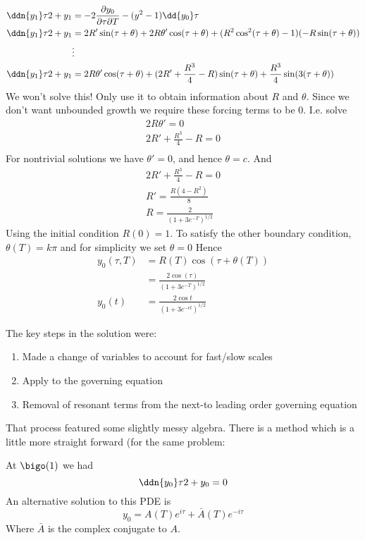 \documentclass{X:/Documents/Coding/Latex/myassignment}
\begin{document}
\begin{align*}
        \ddn{y_1}\tau2 + y_1 &= - 2\frac{\partial y_0}{\partial \tau \partial T} - (y^2-1)\dd{y_0}\tau\\
        \ddn{y_1}\tau2 + y_1 &=  2R'\sin(\tau+\theta) + 2R\theta'\cos(\tau+\theta) +(R^2\cos^2(\tau+\theta)-1)(-R\sin(\tau+\theta))\\
        &\vdots\\
        \ddn{y_1}\tau2 + y_1 &=  2R\theta'\cos(\tau+\theta) + (2R' + \frac{R^3}{4} - R) \sin(\tau +\theta) + \frac{R^3}{4} \sin(3(\tau+\theta))
\end{align*}
We won't solve this! Only use it to obtain information about $R$ and $\theta$.
Since we don't want unbounded growth we require these forcing terms to be $0$. I.e. solve
\begin{align*}
    2R\theta' =0\\
    2R' + \frac{R^3}{4} - R = 0\\
\end{align*}
For nontrivial solutions we have $\theta' =0$, and hence $\theta = c$. And 
\begin{align*}
    2R' + \frac{R^3}{4} - R = 0\\
    R' = \frac{R(4-R^2)}{8}\\ 
    R = \frac{2}{(1+3e^{-T})^{1/2}}
\end{align*}
Using the initial condition $R(0)=1$.
To satisfy the other boundary condition, $\theta(T) = k\pi$ and for simplicity we set $\theta =0 $
Hence
\begin{align*}
    y_0(\tau,T) &= R(T) \cos(\tau + \theta(T))\\
    &= \frac{2\cos(\tau)}{(1+3e^{-T})^{1/2}}\\
    y_0(t)&= \frac{2\cos t}{(1+3e^{-\epsilon t})^{1/2}}
\end{align*}

The key steps in the solution were:
\begin{enumerate}
    \item Made a change of variables to account for fast/slow scales
    \item Apply to the governing equation
    \item Removal of resonant terms from the next-to leading order governing equation
\end{enumerate}
That process featured some slightly messy algebra. There is a method which is a little more straight forward (for the same problem:


At $\bigo(1)$ we had
\[\ddn{y_0}\tau 2 + y_0 = 0\]
An alternative solution to this PDE is
\[y_0 = A(T) e^{i\tau} + \bar{A}(T)e^{-i\tau}\]
Where $\bar{A}$ is the complex conjugate to $A$.
\end{document}
